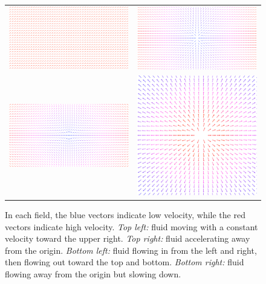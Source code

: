 \documentclass{myarticle}
\theoremstyle{nospace}
\newtheorem{old series theorem}{Theorem}
\newenvironment{series theorem}
{\begin{mdframed}\begin{old series theorem}}
    {\end{old series theorem}\end{mdframed}}
\begin{document}
\begin{figure}[htb!] \centering
  \begin{tabular}{cc}
    \includegraphics[width=65mm]{data/velocityfield1.pdf}
    & \includegraphics[width=65mm]{data/velocityfield2.pdf} \\
    \includegraphics[width=65mm]{data/velocityfield3.pdf}
    & \includegraphics[width=65mm]{data/velocityfield4.pdf} \\
  \end{tabular}
  \caption{In each field, the blue vectors indicate low velocity,
    while the red vectors indicate high velocity. \textit{Top left:}
    fluid moving with a constant velocity toward the upper right.
    \textit{Top right:} fluid accelerating away from the origin.
    \textit{Bottom left:} fluid flowing in from the left and right,
    then flowing out toward the top and bottom. \textit{Bottom right:}
    fluid flowing away from the origin but slowing down.}
  \label{fig:velocity fields}
\end{figure}
\end{document}
